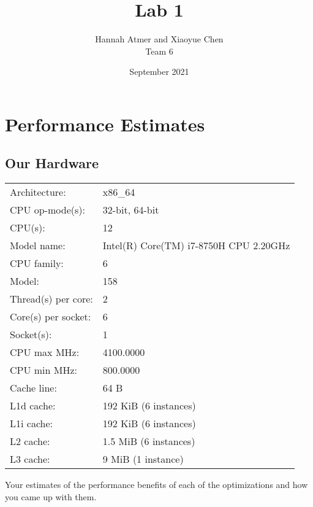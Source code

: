 \documentclass{article} \usepackage[utf8]{inputenc}
\title{Lab 1} \author{Hannah Atmer and Xiaoyue Chen \\ Team 6}
\date{September 2021}
\begin{document}
\maketitle
\section{Performance Estimates}
\subsection{Our Hardware}

\begin{tabular}{l | l}
Architecture:                    & x86\_64 \\
CPU op-mode(s):                  & 32-bit, 64-bit \\
CPU(s):                          & 12 \\
Model name:                      & Intel(R) Core(TM) i7-8750H CPU \@
                                   2.20GHz \\
CPU family:                      & 6 \\
Model:                           & 158 \\
Thread(s) per core:              & 2 \\
Core(s) per socket:              & 6 \\
Socket(s):                       & 1 \\
CPU max MHz:                     & 4100.0000 \\
CPU min MHz:                     & 800.0000 \\
Cache line:                      & 64 B \\
L1d cache:                       & 192 KiB (6 instances) \\
L1i cache:                       & 192 KiB (6 instances) \\
L2 cache:                        & 1.5 MiB (6 instances) \\
L3 cache:                        & 9 MiB (1 instance) \\
\end{tabular}





Your estimates of the performance benefits of each of the
optimizations and how you came up with them.
\end{document}
